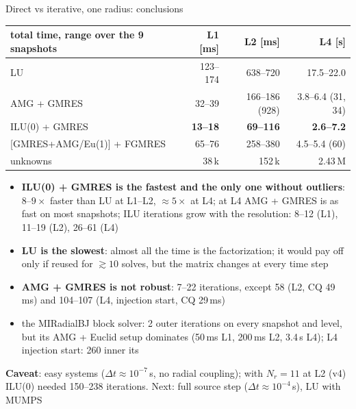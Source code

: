 \begin{frame}{Direct vs iterative, one radius: conclusions}
    \footnotesize
    \begin{center}
    \begin{tabular}{l|rr|r}
        \hline
        total time, range over the 9 snapshots & L1 [ms] & L2 [ms] & L4 [s] \\
        \hline
        LU                                  & 123--174 & 638--720 & 17.5--22.0 \\
        AMG + GMRES                         & 32--39   & 166--186 (928) & 3.8--6.4 (31, 34) \\
        ILU(0) + GMRES                      & \textbf{13--18} & \textbf{69--116} & \textbf{2.6--7.2} \\
        {[GMRES+AMG/Eu(1)] + FGMRES}        & 65--76   & 258--380 & 4.5--5.4 (60) \\
        \hline
        unknowns                            & 38\,k & 152\,k & 2.43\,M \\
        \hline
    \end{tabular}
    \end{center}
    \vspace{0.2em}
    \begin{itemize}
        \item \textbf{ILU(0) + GMRES is the fastest and the only one without outliers}: $8$--$9\times$ faster
              than LU at L1--L2, $\approx 5\times$ at L4; at L4 AMG + GMRES is as fast on most snapshots;
              ILU iterations grow with the resolution: 8--12 (L1), 11--19 (L2), 26--61 (L4)
        \item \textbf{LU is the slowest}: almost all the time is the factorization; it would pay off
              only if reused for $\gtrsim 10$ solves, but the matrix changes at every time step
        \item \textbf{AMG + GMRES is not robust}: 7--22 iterations, except 58 (L2, CQ 49\,ms)
              and 104--107 (L4, injection start, CQ 29\,ms)
        \item the MIRadialBJ block solver: 2 outer iterations on every snapshot and level, but its
              AMG + Euclid setup dominates (50\,ms L1, 200\,ms L2, 3.4\,s L4); L4 injection start: 260 inner its
    \end{itemize}
    \vspace{0.2em}
    \textbf{Caveat}: easy systems ($\Delta t \approx 10^{-7}$\,s, no radial coupling); with $N_r = 11$ at L2 (v4)
    ILU(0) needed 150--238 iterations. Next: full source step ($\Delta t \approx 10^{-4}$\,s), LU with MUMPS
\end{frame}

